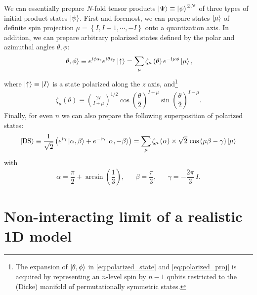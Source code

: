 \documentclass[nofootinbib,notitlepage,11pt]{revtex4-2}
\newcommand{\f}[2]{\dfrac{#1}{#2}} %
\newcommand{\p}[1]{\left(#1\right)} %
\renewcommand{\set}[1]{\left\{#1\right\}} %
\renewcommand{\i}{\mathrm{i}\mkern1mu} %
\newcommand{\1}{\mathds{1}}
\newcommand{\up}{\uparrow}
\newcommand{\y}{\text{y}}
\newcommand{\z}{\text{z}}
\newcommand{\DS}{\text{DS}}
\begin{document}
We can essentially prepare $N$-fold tensor products $\ket\Psi\equiv\ket\psi^{\otimes N}$ of three types of initial product states $\ket\psi$.
First and foremost, we can prepare states $\ket{\mu}$ of definite spin projection $\mu=\set{I,I-1,\cdots,-I}$ onto a quantization axis.
In addition, we can prepare arbitrary polarized states defined by the polar and azimuthal angles $\theta,\phi$:
\begin{align}
  \ket{\theta,\phi}
  \equiv e^{i\phi s_\z} e^{i\theta s_\y} \ket\up
  = \sum_\mu \zeta_\mu\p{\theta} e^{-\i\mu\phi} \ket\mu,
  \label{eq:polarized_state}
\end{align}
where $\ket\up\equiv\ket{I}$ is a state polarized along the $z$ axis, and\footnote{The expansion of $\ket{\theta,\phi}$ in \eqref{eq:polarized_state} and \eqref{eq:polarized_proj} is acquired by representing an $n$-level spin by $n-1$ qubits restricted to the (Dicke) manifold of permutationally symmetric states.}
\begin{align}
  \zeta_\mu\p{\theta} \equiv { 2I \choose I+\mu }^{1/2}
  \cos\p{\f{\theta}{2}}^{I+\mu} \sin\p{\f{\theta}{2}}^{I-\mu}.
  \label{eq:polarized_proj}
\end{align}
Finally, for even $n$ we can also prepare the following superposition of polarized states:
\begin{align}
  \ket{\DS}
  \equiv \f1{\sqrt{2}}
  \p{e^{\i\gamma} \ket{\alpha,\beta}
    + e^{-\i\gamma} \ket{\alpha,-\beta}}
  = \sum_\mu \zeta_\mu\p{\alpha}
  \times \sqrt{2}\, \cos\p{\mu\beta-\gamma} \ket\mu
  \label{eq:double_state}
\end{align}
with
\begin{align}
  \alpha = \f{\pi}{2} + \arcsin\p{\f13},
  &&
  \beta = \f{\pi}{3},
  &&
  \gamma = -\f{2\pi}{3}\, I.
\end{align}

\section{Non-interacting limit of a realistic 1D model}
\end{document}
